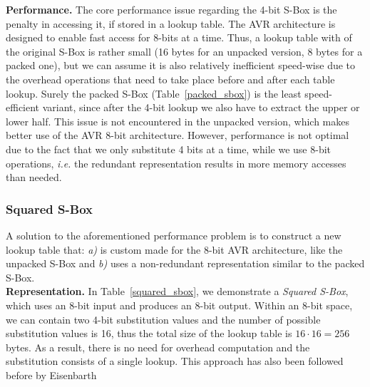 \documentclass[11pt]{llncs2e} %
\begin{document}
\textbf{Performance.} The core performance issue regarding the 4-bit S-Box is the penalty in accessing it, if stored in a lookup table. The AVR architecture is designed to enable fast access for 8-bits at a time.
Thus, a lookup table with of the original S-Box is rather small (16 bytes for an unpacked version, 8 bytes for a packed one), but we can assume it is also relatively inefficient speed-wise due to the overhead operations that need to take place before and after each table lookup.
Surely the packed S-Box (Table~\ref{packed_sbox}) is the least speed-efficient variant, since after the 4-bit lookup we also have to extract the upper or lower half.
This issue is not encountered in the unpacked version, which makes better use of the AVR 8-bit architecture.
However, performance is not optimal due to the fact that we only substitute 4 bits at a time, while we use 8-bit operations, \emph{i.e.} the redundant representation results in more memory accesses than needed. 

\subsubsection{Squared S-Box}\label{ssbox}
A solution to the aforementioned performance problem is to construct a new lookup table that: \emph{a)} is custom made for the 8-bit AVR architecture, like the unpacked S-Box and \emph{b)} uses a non-redundant representation similar to the packed S-Box.\\
\textbf{Representation.} In Table~\ref{squared_sbox}, we demonstrate a \emph{Squared S-Box}, which uses an 8-bit input and produces an 8-bit output. Within an 8-bit space, we can contain two 4-bit substitution values and the number of possible substitution values is 16, thus the total size of the lookup table is $16 \cdot 16=256$ bytes. As a result, there is no need for overhead computation and the substitution consists of a single lookup. This approach has also been followed before by Eisenbarth~\cite{eisenbarth2012compact}\\
\end{document}
